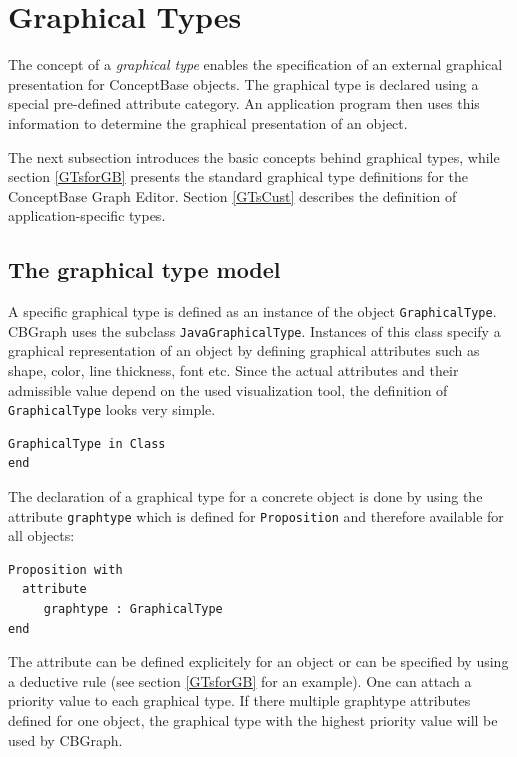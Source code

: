
\chapter{Graphical Types}
\label{cha:graph-typen}



The concept of a {\em graphical type} enables the specification
of an external graphical presentation for ConceptBase objects.
The graphical type is declared
using a special pre-defined attribute category.
An application program then uses this information to determine the
graphical presentation of an object.

The next subsection introduces the basic concepts behind
graphical types, while section \ref{GTsforGB} presents the
standard graphical type definitions for the ConceptBase Graph
Editor. Section \ref{GTsCust} describes the definition
of application-specific types.


\section{The graphical type model}

A specific graphical type is defined as an instance of the object
{\tt Graphical\-Type}. CBGraph uses the subclass {\tt Java\-Graphical\-Type}.
Instances of this class specify a graphical
representation of an object by defining graphical attributes such as
shape, color, line thickness, font etc. Since the
actual attributes and their admissible value depend on the
used visualization tool, the definition of {\tt Graphical\-Type} looks very simple.

{\small
\begin{verbatim}
GraphicalType in Class
end
\end{verbatim}
}

The declaration of a graphical type for a concrete object is done
by using the attribute {\tt graphtype} which
is defined for {\tt Proposition} and therefore
available for all objects:

{\small
\begin{verbatim}
Proposition with
  attribute
     graphtype : GraphicalType
end
\end{verbatim}
}

The attribute can be defined explicitely for an object or can be specified
by using a deductive rule (see section \ref{GTsforGB} for an example).
One can attach a priority value to each
graphical type. If there multiple graphtype attributes defined for one
object, the graphical type with the highest priority value will be used
by CBGraph.

